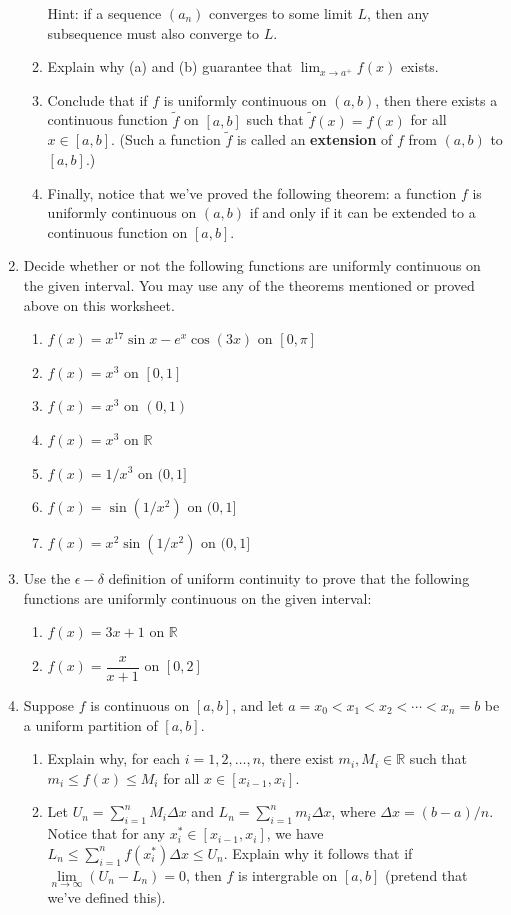 \documentclass[letterpaper,12pt]{article}
\newcommand{\R}{\mathbb{R}}
\begin{document}
\begin{enumerate}
\begin{enumerate}
Hint: if a sequence $(a_n)$ converges to some limit $L$, then any subsequence must also converge to $L$.
        \item Explain why (a) and (b) guarantee that $\lim_{x\to a^+}f(x)$ exists.
	\item Conclude that if $f$ is uniformly continuous on $(a,b)$, then there exists a continuous function $\tilde{f}$ on $[a,b]$ such that $\tilde{f}(x) = f(x)$ for all $x\in [a,b]$. (Such a function $\tilde{f}$ is called an {\bf extension} of $f$ from $(a,b)$ to $[a,b]$.)
	\item Finally, notice that we've proved the following theorem: a function $f$ is uniformly continuous on $(a,b)$ if and only if it can be extended to a continuous function on $[a,b]$.
       \end{enumerate}
 \item Decide whether or not the following functions are uniformly continuous on the given interval. You may use any of the theorems mentioned or proved above on this worksheet.
\begin{enumerate}
 \item $f(x)=x^{17}\sin x-e^x\cos(3x)$ on $[0,\pi]$
 \item $f(x)=x^3$ on $[0,1]$
 \item $f(x)=x^3$ on $(0,1)$
 \item $f(x)=x^3$ on $\R$
 \item $f(x)=1/x^3$ on $(0,1]$
 \item $f(x)=\sin(1/x^2)$ on $(0,1]$
 \item $f(x)=x^2\sin(1/x^2)$ on $(0,1]$
\end{enumerate}
 \item Use the $\epsilon-\delta$ definition of uniform continuity to prove that the following functions are uniformly continuous on the given interval:
\begin{enumerate}
 \item $f(x)=3x+1$ on $\R$
 \item $f(x)=\dfrac{x}{x+1}$ on $[0,2]$
\end{enumerate}
\item Suppose $f$ is continuous on $[a,b]$, and let $a=x_0<x_1<x_2<\cdots<x_n=b$ be a uniform partition of $[a,b]$.
\begin{enumerate}
 \item Explain why, for each $i=1,2,\ldots, n$, there exist $m_i,M_i\in\R$ such that $m_i\leq f(x)\leq M_i$ for all $x\in [x_{i-1},x_i]$.
 \item Let $\displaystyle U_n = \sum_{i=1}^nM_i\Delta x$ and $\displaystyle L_n = \sum_{i=1}^nm_i\Delta x$, where $\Delta x= (b-a)/n$. Notice that for any $x_i^*\in [x_{i-1},x_i]$, we have $\displaystyle L_n\leq \sum_{i=1}^n f(x_i^*)\Delta x\leq U_n$. Explain why it follows that if $\lim\limits_{n\to\infty}(U_n-L_n)=0$, then $f$ is intergrable on $[a,b]$ (pretend that we've defined this).

\end{enumerate}
\end{enumerate}
\end{document}
